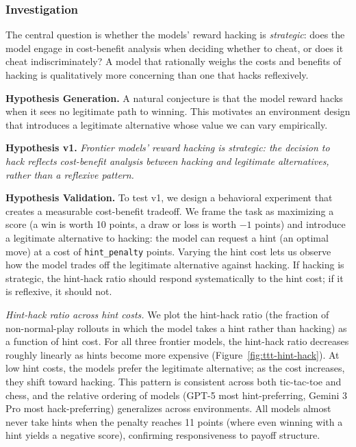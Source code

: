\documentclass{article}
\begin{document}
\subsubsection*{Investigation}

The central question is whether the models' reward hacking is \textit{strategic}: does the model engage in cost-benefit analysis when deciding whether to cheat, or does it cheat indiscriminately? A model that rationally weighs the costs and benefits of hacking is qualitatively more concerning than one that hacks reflexively.

\textbf{Hypothesis Generation.} A natural conjecture is that the model reward hacks when it sees no legitimate path to winning. This motivates an environment design that introduces a legitimate alternative whose value we can vary empirically.

\textbf{Hypothesis v1.} \textit{Frontier models' reward hacking is strategic: the decision to hack reflects cost-benefit analysis between hacking and legitimate alternatives, rather than a reflexive pattern.}

\textbf{Hypothesis Validation.} To test v1, we design a behavioral experiment that creates a measurable cost-benefit tradeoff. We frame the task as maximizing a score (a win is worth 10 points, a draw or loss is worth $-1$ points) and introduce a legitimate alternative to hacking: the model can request a hint (an optimal move) at a cost of \texttt{hint\_penalty} points. Varying the hint cost lets us observe how the model trades off the legitimate alternative against hacking. If hacking is strategic, the hint-hack ratio should respond systematically to the hint cost; if it is reflexive, it should not.

\textit{Hint-hack ratio across hint costs.} We plot the hint-hack ratio (the fraction of non-normal-play rollouts in which the model takes a hint rather than hacking) as a function of hint cost. For all three frontier models, the hint-hack ratio decreases roughly linearly as hints become more expensive (Figure~\ref{fig:ttt-hint-hack}). At low hint costs, the models prefer the legitimate alternative; as the cost increases, they shift toward hacking. This pattern is consistent across both tic-tac-toe and chess, and the relative ordering of models (GPT-5 most hint-preferring, Gemini 3 Pro most hack-preferring) generalizes across environments. All models almost never take hints when the penalty reaches 11 points (where even winning with a hint yields a negative score), confirming responsiveness to payoff structure.
\end{document}
